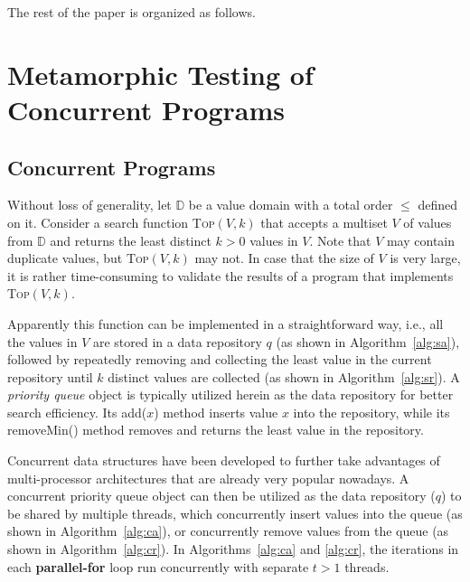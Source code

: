 \documentclass[conference]{IEEEtran}
\theoremstyle{remark}
\newcommand{\Fn}{\textsc{Top}}
\begin{document}

The rest of the paper is organized as follows.

\section{Metamorphic Testing of Concurrent Programs}
\subsection{Concurrent Programs}

Without loss of generality, let $\mathbb{D}$ be a value domain with a total order $\leq$ defined on it.
Consider a search function \Fn$(V,k)$ that accepts a multiset $V$ of values from $\mathbb{D}$ and returns %
the least distinct $k>0$ values in $V$. Note that $V$ may contain duplicate values, but \Fn$(V,k)$ may not. In case that the size of $V$ is very large, it is rather time-consuming to validate the results of a program that implements \Fn$(V,k)$.

Apparently this function can be implemented in a straightforward way, i.e., all the values in $V$ are  stored in a data repository $q$ (as shown in Algorithm~\ref{alg:sa}), followed by repeatedly removing and collecting the least value in the current repository until $k$ distinct values are collected (as shown in Algorithm~\ref{alg:sr}). A \emph{priority queue} object is typically utilized herein as the data repository for better search efficiency. Its add($x$) method inserts value $x$ into the repository, while its removeMin() method removes and returns the least value in the repository.

Concurrent data structures \cite{PQUEUE} have been developed to further take advantages of multi-processor architectures that are already very popular nowadays. A concurrent priority queue object  can then be utilized as the data repository ($q$) to be shared by multiple threads, which concurrently insert values into the queue (as shown in Algorithm~\ref{alg:ca}), or concurrently remove values from the queue (as shown in Algorithm~\ref{alg:cr}). In Algorithms~\ref{alg:ca} and \ref{alg:cr}, the iterations in each \textbf{parallel-for} loop run concurrently with separate $t>1$ threads. 
\end{document}
